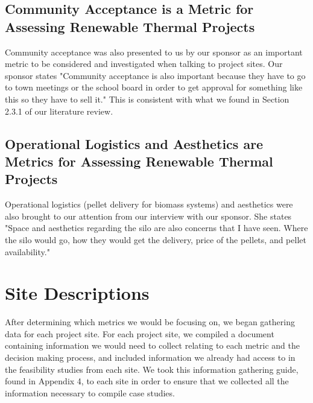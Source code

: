 \subsection{Community Acceptance is a Metric for Assessing Renewable Thermal Projects}
\par Community acceptance was also presented to us by our sponsor as an important metric to be considered and investigated when talking to project sites. Our sponsor states "Community acceptance is also important because they have to go to town meetings or the school board in order to get approval for something like this so they have to sell it." This is consistent with what we found in Section 2.3.1 of our literature review.

\subsection{Operational Logistics and Aesthetics are Metrics for Assessing Renewable Thermal Projects}
\par Operational logistics (pellet delivery for biomass systems) and aesthetics were also brought to our attention from our interview with our sponsor. She states "Space and aesthetics regarding the silo are also concerns that I have seen. Where the silo would go, how they would get the delivery, price of the pellets, and pellet availability."

\section{Site Descriptions}
\par After determining which metrics we would be focusing on, we began gathering data for each project site. For each project site, we compiled a document containing information we would need to collect relating to each metric and the decision making process, and included information we already had access to in the feasibility studies from each site. We took this information gathering guide, found in Appendix 4, to each site in order to ensure that we collected all the information necessary to compile case studies.

